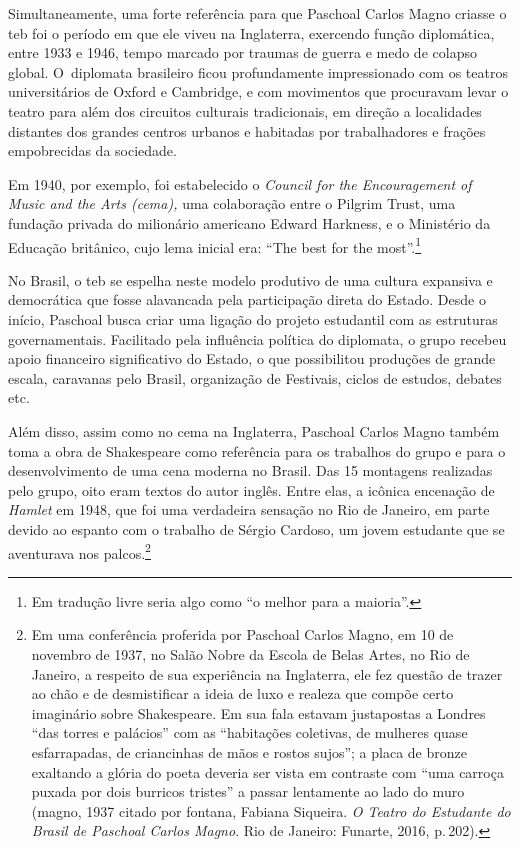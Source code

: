 {Simultaneamente, uma forte referência para que Paschoal Carlos Magno
criasse o {\sc teb} foi o período em que ele viveu na Inglaterra, exercendo
função diplomática, entre 1933 e 1946, tempo marcado por traumas de
guerra e medo de colapso global. O~diplomata brasileiro ficou
profundamente impressionado com os teatros universitários de Oxford e
Cambridge, e com movimentos que procuravam levar o teatro para além dos
circuitos culturais tradicionais, em direção a localidades distantes dos
grandes centros urbanos e habitadas por trabalhadores e frações
empobrecidas da sociedade.

Em 1940, por exemplo, foi estabelecido o {\it Council for the
Encouragement of Music and the Arts ({\sc cema}),} uma colaboração entre o
Pilgrim Trust, uma fundação privada do milionário americano Edward
Harkness, e o Ministério da Educação britânico, cujo lema inicial era:
“The best for the most”.\footnote{Em tradução livre seria algo como “o
  melhor para a maioria”.}

No Brasil, o {\sc teb} se espelha neste modelo produtivo de uma cultura
expansiva e democrática que fosse alavancada pela participação direta do
Estado. Desde o início, Paschoal busca criar uma ligação do projeto
estudantil com as estruturas governamentais. Facilitado pela influência
política do diplomata, o grupo recebeu apoio financeiro significativo do
Estado, o que possibilitou produções de grande escala, caravanas pelo
Brasil, organização de Festivais, ciclos de estudos, debates etc.

Além disso, assim como no {\sc cema} na Inglaterra, Paschoal Carlos Magno
também toma a obra de Shakespeare como referência para os trabalhos do
grupo e para o desenvolvimento de uma cena moderna no Brasil. Das 15
montagens realizadas pelo grupo, oito eram textos do autor inglês. Entre
elas, a icônica encenação de {\it Hamlet} em 1948, que foi uma
verdadeira sensação no Rio de Janeiro, em parte devido ao espanto com o
trabalho de Sérgio Cardoso, um jovem estudante que se aventurava nos
palcos.\footnote{Em uma conferência proferida por Paschoal Carlos Magno,
  em 10 de novembro de 1937, no Salão Nobre da Escola de Belas Artes, no
  Rio de Janeiro, a respeito de sua experiência na Inglaterra, ele fez
  questão de trazer ao chão e de desmistificar a ideia de luxo e realeza
  que compõe certo imaginário sobre Shakespeare. Em sua fala estavam
  justapostas a Londres “das torres e palácios” com as “habitações
  coletivas, de mulheres quase esfarrapadas, de criancinhas de mãos e
  rostos sujos”; a placa de bronze exaltando a glória do poeta deveria
  ser vista em contraste com “uma carroça puxada por dois burricos
  tristes” a passar lentamente ao lado do muro ({\sc magno}, 1937 citado por
  {\sc fontana}, Fabiana Siqueira. {\it O Teatro do Estudante do Brasil de
  Paschoal Carlos Magno}. Rio de Janeiro: Funarte, 2016, p.\,202).}

}
